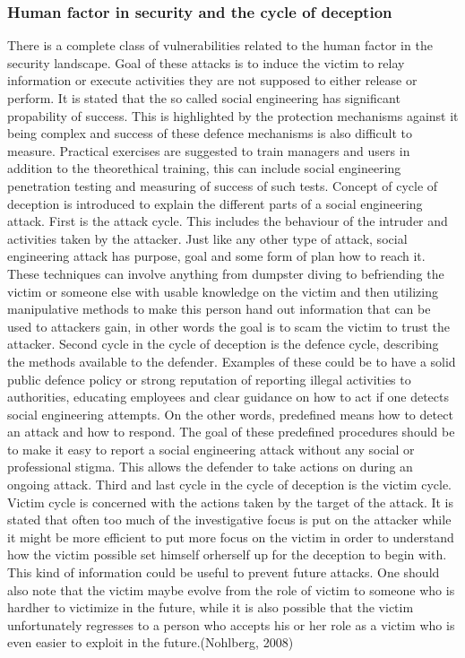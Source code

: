 \documentclass{article}
\begin{document}
\subsubsection{Human factor in security and the cycle of deception}
There is a complete class of vulnerabilities related to the human factor in the security landscape. Goal of these attacks is to induce the victim to relay information or execute activities they are not supposed to either release or perform.
It is stated that the so called social engineering has significant propability of success. This is highlighted by the protection mechanisms against it being complex and success of these defence mechanisms is also difficult to measure.
Practical exercises are suggested to train managers and users in addition to the theorethical training, this can include social engineering penetration testing and measuring of success of such tests.
Concept of cycle of deception is introduced to explain the different parts of a social engineering attack. First is the attack cycle. This includes the behaviour of the intruder and activities taken by the attacker. Just like any other type of attack, social engineering attack has purpose, goal and some form of plan how to reach it. These techniques can involve anything from dumpster diving to befriending the victim or someone else with usable knowledge on the victim and then utilizing manipulative methods to make this person hand out information that can be used to attackers gain, in other words the goal is to scam the victim to trust the attacker. 
Second cycle in the cycle of deception is the defence cycle, describing the methods available to the defender. Examples of these could be to have a solid public defence policy or strong reputation of reporting illegal activities to authorities, educating employees and clear guidance on how to act if one detects social engineering attempts. On the other words, predefined means how to detect an attack and how to respond. The goal of these predefined procedures should be to make it easy to report a social engineering attack without any social or professional stigma. This allows the defender to take actions on during an ongoing attack.
Third and last cycle in the cycle of deception is the victim cycle. Victim cycle is concerned with the actions taken by the target of the attack. It is stated that often too much of the investigative focus is put on the attacker while it might be more efficient to put more focus on the victim in order to understand how the victim possible set himself orherself up for the deception to begin with. This kind of information could be useful to prevent future attacks. One should also note that the victim maybe evolve from the role of victim to someone who is hardher to victimize in the future, while it is also possible that the victim unfortunately regresses to a person who accepts his or her role as a victim who is even easier to exploit in the future.(Nohlberg, 2008)
\end{document}
